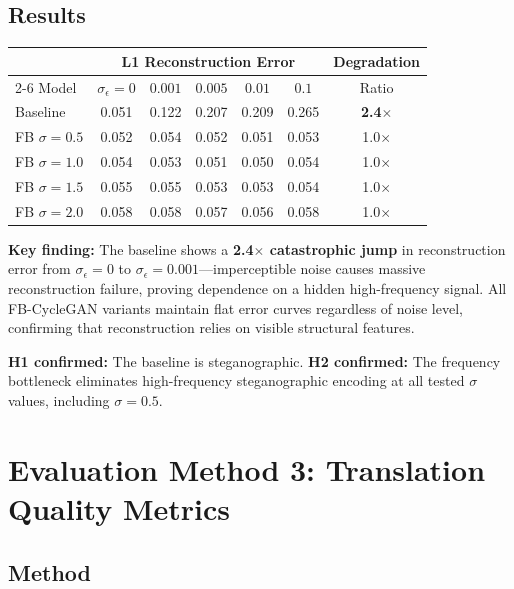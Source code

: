 \documentclass[11pt,a4paper]{article}
\theoremstyle{definition}
\begin{document}
\subsection{Results}

\begin{center}
\begin{tabular}{lcccccc}
\toprule
& \multicolumn{5}{c}{L1 Reconstruction Error} & Degradation \\
\cmidrule(lr){2-6}
Model & $\sigma_\epsilon=0$ & $0.001$ & $0.005$ & $0.01$ & $0.1$ & Ratio \\
\midrule
Baseline & 0.051 & 0.122 & 0.207 & 0.209 & 0.265 & \textbf{2.4$\times$} \\
FB $\sigma=0.5$ & 0.052 & 0.054 & 0.052 & 0.051 & 0.053 & 1.0$\times$ \\
FB $\sigma=1.0$ & 0.054 & 0.053 & 0.051 & 0.050 & 0.054 & 1.0$\times$ \\
FB $\sigma=1.5$ & 0.055 & 0.055 & 0.053 & 0.053 & 0.054 & 1.0$\times$ \\
FB $\sigma=2.0$ & 0.058 & 0.058 & 0.057 & 0.056 & 0.058 & 1.0$\times$ \\
\bottomrule
\end{tabular}
\end{center}

\textbf{Key finding:} The baseline shows a \textbf{2.4$\times$ catastrophic jump} in reconstruction error from $\sigma_\epsilon = 0$ to $\sigma_\epsilon = 0.001$---imperceptible noise causes massive reconstruction failure, proving dependence on a hidden high-frequency signal. All FB-CycleGAN variants maintain flat error curves regardless of noise level, confirming that reconstruction relies on visible structural features.

\textbf{H1 confirmed:} The baseline is steganographic. \textbf{H2 confirmed:} The frequency bottleneck eliminates high-frequency steganographic encoding at all tested $\sigma$ values, including $\sigma = 0.5$.

\section{Evaluation Method 3: Translation Quality Metrics}
\label{sec:quality}

\subsection{Method}
\end{document}
